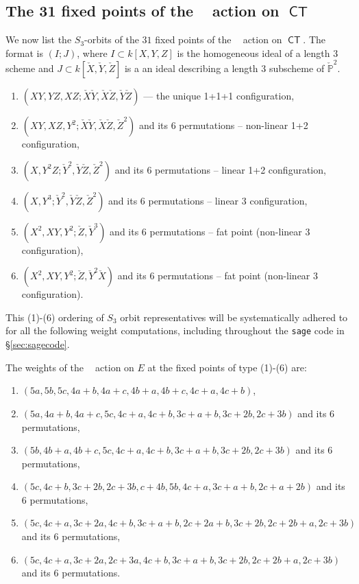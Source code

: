 \documentclass{article}
\renewcommand{\P}{\mathbb{P}}
\DeclareMathOperator{\CT}{\mathsf{CT}}
\DeclareMathOperator{\Gm}{\mathbb{G}_{m}}
\begin{document}
\subsection{The 31 fixed points of the $\Gm$ action on $\CT$}
We now list the $S_3$-orbits of the $31$ fixed points of the $\Gm$ action on
$\CT$.  The format is $(I; J)$, where $I \subset k[X,Y,Z]$ is the homogeneous ideal
of a length 3 scheme and $J \subset k[\check{X},\check{Y},\check{Z}]$ is a an ideal describing a length $3$ subscheme of $\check{\P}^{2}$.
\begin{enumerate}
\item $(XY, YZ, XZ; \check{X} \check{Y},\check{X} \check{Z},\check{Y} \check{Z})$ --- the unique 1+1+1 configuration,
\item $(XY, XZ, Y^2; \check{X}\check{Y}, \check{X}\check{Z}, \check{Z}^2)$ and its 6 permutations -- non-linear 1+2 configuration,
\item $(X, Y^2Z; \check{Y}^2 ,\check{Y}\check{Z} , \check{Z}^2)$ and its 6 permutations -- linear 1+2 configuration, 
\item $(X, Y^3; \check{Y}^2 ,\check{Y}\check{Z} , \check{Z}^2)$ and its 6 permutations -- linear 3 configuration,
\item $(X^2, XY, Y^2; \check{Z}, \check{Y}^{3})$ and its 6 permutations -- fat point (non-linear 3 configuration),
\item $(X^2, XY, Y^2; \check{Z}, \check{Y}^{2}\check{X})$ and its 6 permutations -- fat point (non-linear 3 configuration).
\end{enumerate}

This (1)-(6) ordering of $S_3$ orbit representatives will be systematically adhered to for all the following weight computations, including throughout the \texttt{sage} code in \S \ref{sec:sagecode}.

\begin{proposition}
The weights of the $\Gm$ action on $E$ at the fixed points of type (1)-(6) are:
\begin{enumerate}
\item $(5a, 5b, 5c, 4a+b, 4a+c, 4b+a, 4b+c, 4c+a, 4c+b)$,
\item $(5a, 4a+b, 4a+c, 5c, 4c+a, 4c+b, 3c+a+b, 3c+2b, 2c+3b)$ and its 6 permutations,
\item $(5b, 4b+a, 4b+c, 5c, 4c+a, 4c+b, 3c+a+b, 3c+2b, 2c+3b)$ and its 6 permutations,
\item $(5c, 4c+b, 3c+2b, 2c+3b, c+4b, 5b, 4c+a, 3c+a+b, 2c+a+2b)$ and its 6 permutations,
\item $(5c, 4c+a, 3c+2a, 4c+b, 3c+a+b, 2c+2a+b, 3c+2b, 2c+2b+a, 2c+3b)$ and its 6 permutations,
\item $(5c, 4c+a, 3c+2a, 2c+3a, 4c+b, 3c+a+b, 3c+2b, 2c+2b+a, 2c+3b)$ and its 6 permutations.
\end{enumerate}
\end{proposition}
\end{document}
